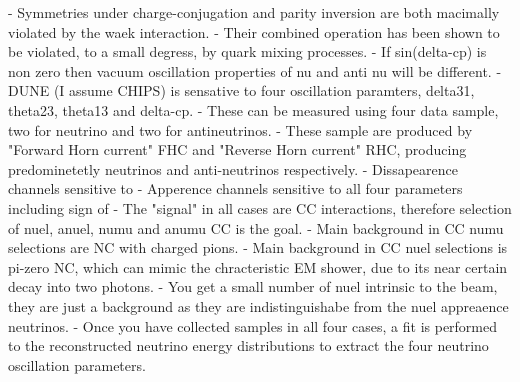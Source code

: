 - Symmetries under charge-conjugation and parity inversion are both macimally violated by the
waek interaction.
- Their combined operation has been shown to be violated, to a small degress, by quark mixing
processes.
- If sin(delta-cp) is non zero then vacuum oscillation properties of nu and anti nu will be
different.
- DUNE (I assume CHIPS) is sensative to four oscillation paramters, delta31, theta23, theta13
and delta-cp.
- These can be measured using four data sample, two for neutrino and two for antineutrinos.
- These sample are produced by "Forward Horn current" FHC and "Reverse Horn current" RHC,
producing predominetetly neutrinos and anti-neutrinos respectively.
- Dissapearence channels sensitive to %
- Apperence channels sensitive to all four parameters including sign of %
- The "signal" in all cases are CC interactions, therefore selection of nuel, anuel, numu and
anumu CC is the goal.
- Main background in CC numu selections are NC with charged pions.
- Main background in CC nuel selections is pi-zero NC, which can mimic the chracteristic EM
shower, due to its near certain decay into two photons.
- You get a small number of nuel intrinsic to the beam, they are just a background as they are
indistinguishabe from the nuel appreaence neutrinos.
- Once you have collected samples in all four cases, a fit is performed to the reconstructed
neutrino energy distributions to extract the four neutrino oscillation parameters.